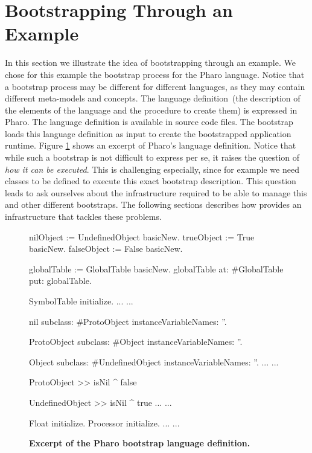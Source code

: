 \section{Bootstrapping Through an Example}\label{sec:bootstrapping_process}

In this section we illustrate the idea of bootstrapping through an example. We chose for this example the bootstrap process for the Pharo language. Notice that a bootstrap process may be different for different languages, as they may contain different meta-models and concepts. The language definition~(\ie the description of the elements of the language and the procedure to create them) is expressed in Pharo. The language definition is available in source code files. The bootstrap loads this language definition as input to create the bootstrapped application runtime. Figure \ref{fig:example_language_definition} shows an excerpt of Pharo's language definition. Notice that while such a bootstrap is not difficult to express per se, it raises the question of \emph{how it can be executed}. This is challenging especially, since for example we need classes to be defined to execute this exact bootstrap description. This question leads to ask ourselves about the infrastructure required to be able to manage this and other different bootstraps. The following sections describes how \Vtt provides an infrastructure that tackles these problems.

\begin{figure}[ht]
\begin{code}
nilObject := UndefinedObject basicNew.
trueObject := True basicNew.
falseObject := False basicNew.

globalTable := GlobalTable basicNew.
globalTable
    at: #GlobalTable
    put: globalTable.
    
SymbolTable initialize.
...
...

nil subclass: #ProtoObject
    instanceVariableNames: ''.

ProtoObject subclass: #Object
    instanceVariableNames: ''.
    
Object subclass: #UndefinedObject
    instanceVariableNames: ''.
...
...

ProtoObject >> isNil
   ^ false

UndefinedObject >> isNil
   ^ true
...
...
    
Float initialize.
Processor initialize.
...
...
\end{code}
\caption{\textbf{Excerpt of the Pharo bootstrap language definition.}\label{fig:example_language_definition}}
\end{figure}

